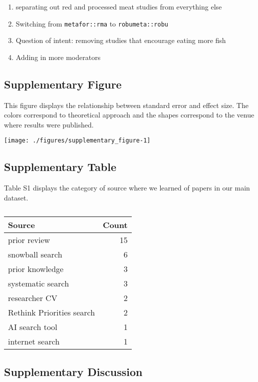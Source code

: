 \documentclass[sn-nature,pdflatex]{sn-jnl}
\providecommand{\tightlist}{%
  \setlength{\itemsep}{0pt}\setlength{\parskip}{0pt}}
\begin{document}
\begin{enumerate}
\def\labelenumi{\arabic{enumi}.}
\tightlist
\item
  separating out red and processed meat studies from everything else
\item
  Switching from \texttt{metafor::rma} to \texttt{robumeta::robu}
\item
  Question of intent: removing studies that encourage eating more fish
\item
  Adding in more moderators
\end{enumerate}

\subsection{Supplementary Figure}\label{supplementary-figure}

This figure displays the relationship between standard error and effect
size. The colors correspond to theoretical approach and the shapes
correspond to the venue where results were published.

\texttt{[image: ./figures/supplementary\_figure-1]}

\subsection{Supplementary Table}\label{supplementary-table}

Table S1 displays the category of source where we learned of papers in
our main dataset.

\begin{table}[!h]
\centering
\caption{\label{tab:}}
\centering
\begin{tabular}[t]{lr}
\toprule
Source & Count\\
\midrule
prior review & 15\\
snowball search & 6\\
prior knowledge & 3\\
systematic search & 3\\
researcher CV & 2\\
\addlinespace
Rethink Priorities search & 2\\
AI search tool & 1\\
internet search & 1\\
\bottomrule
\end{tabular}
\end{table}

\subsection{Supplementary Discussion}\label{supplementary-discussion}
\end{document}
